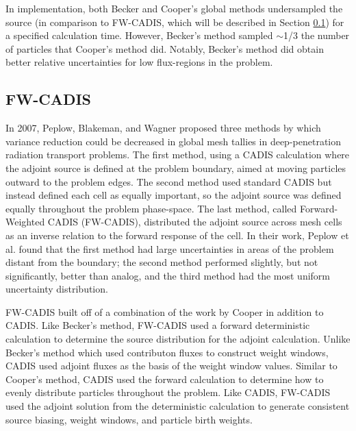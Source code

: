 In implementation, both Becker and Cooper's global methods
undersampled the source (in comparison to FW-CADIS, which will be described in
Section \ref{subsec:FWCADIS}) for a specified calculation
time. However, Becker's method sampled $\sim$1/3 the number of particles that
Cooper's method did. Notably, Becker's method did obtain better relative
uncertainties for low flux-regions in the problem.

\subsection{FW-CADIS}
\label{subsec:FWCADIS}

In 2007, Peplow, Blakeman, and Wagner \cite{peplow_advanced_2007} proposed three
methods by which variance reduction could be decreased in global mesh tallies in
deep-penetration radiation transport problems. The first method, using a CADIS
calculation where the adjoint source is defined at the problem boundary, aimed
at moving particles outward to the problem edges.
The second method used standard CADIS but instead
defined each cell as equally important, so the adjoint source was defined
equally throughout the problem phase-space. The last method, called Forward-Weighted
CADIS (FW-CADIS), distributed the adjoint source across mesh cells as an inverse
relation to the forward response of the cell. In their work, Peplow et al. found
that the first method had large uncertainties in areas of the problem distant
from the boundary; the second method performed slightly, but not significantly,
better than analog, and the third method had the most uniform uncertainty
distribution.

FW-CADIS
\cite{wagner_forward-weighted_2007,wagner_forward-weighted_2009,wagner_forward-weighted_2010}
built off of a combination of the work by Cooper in addition to CADIS.
Like Becker's method, FW-CADIS used a forward deterministic calculation to
determine the source distribution for the adjoint calculation. Unlike Becker's
method which used contributon fluxes to construct weight windows,
CADIS used adjoint fluxes as the basis of the weight window values. Similar to
Cooper's method, CADIS used the forward calculation to determine how to
evenly distribute particles throughout the problem. Like CADIS, FW-CADIS used
the adjoint solution from the deterministic calculation to generate consistent
source biasing, weight windows, and particle birth weights.

